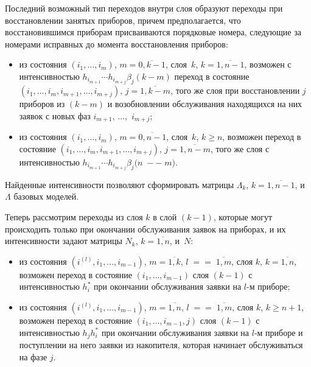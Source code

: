 \begin{multicols}{2}
Последний возможный тип переходов внутри слоя образуют
переходы при восстановлении занятых приборов, причем
предполагается, что восстановившимся приборам присваиваются
порядковые номера, следующие за номерами исправных до момента
восстановления приборов:
\begin{itemize}
\item из состояния $(i_1,\ldots, i_m)$, $m=\overline{0,k-1}$,
слоя~$k$, $k=\overline{1,n-1}$, возможен с интенсивностью
$h_{i_{m+1}}\cdots h_{i_{m+j}}\beta_j(k-m)$ переход в состояние
$(i_1,\ldots,i_{m},i_{m+1},\ldots,i_{m+j})$, $j=\overline{1,k-m}$,
того же слоя при восстановлении $j$ приборов из $(k-m)$ и
возобновлении обслуживания находящихся на них заявок с новых фаз
$i_{m+1},\,\ldots,$ $i_{m+j}$;
\item
из состояния $(i_1,\ldots, i_m)$, $m=\overline{0,n-1}$,
слоя~$k$, $k\ge n$, возможен переход в состояние
$(i_1,\ldots,i_{m},i_{m+1},\ldots,i_{m+j})$, $j=\overline{1,n-m}$,
того же слоя с интенсивностью
$h_{i_{m+1}}\cdots h_{i_{m+j}}\beta_j(n\;-$\linebreak $-\;m)$.  %
\end{itemize}

Найденные интенсивности позволяют сформировать матрицы
$\Lambda_k$, $k=\overline{1,n-1}$, и $\Lambda$ базовых моделей.

Теперь рассмотрим переходы из слоя $k$ в слой $(k-1)$, которые могут
происходить только при окончании обслуживания заявок на приборах,
и их интенсивности задают матрицы $N_k$, $k=\overline{1,n}$, и~$N$:
\begin{itemize}
\item из состояния $\left (i^{(l)},i_1,\ldots,i_{m-1}\right )$,
$m=\overline{1,k}$, $l\;=$\linebreak $=\;\overline{1,m}$,
слоя $k$, $k=\overline{1,n}$, возможен переход в состояние
$\left (i_1,\ldots, i_{m-1}\right )$             %
слоя $(k-1)$ с интенсивностью $h_i^*$ при окончании обслуживания заявки на
$l$-м приборе;
\item
из состояния $\left (i^{(l)},i_1,\ldots,i_{m-1}\right )$,
$m=\overline{1,n}$, $l\;=$\linebreak $=\;\overline{1,m}$,
слоя $k$, $k\ge n+1$, возможен переход в состояние
$\left ( i_1,\ldots,i_{m-1},j\right)$            %
слоя $(k-1)$ с
интенсивностью $h_j h_i^*$ при окончании обслуживания заявки на
$l$-м приборе и поступлении на него заявки из накопителя,
которая начинает обслуживаться на фазе $j$.
\end{itemize}


\end{multicols}
